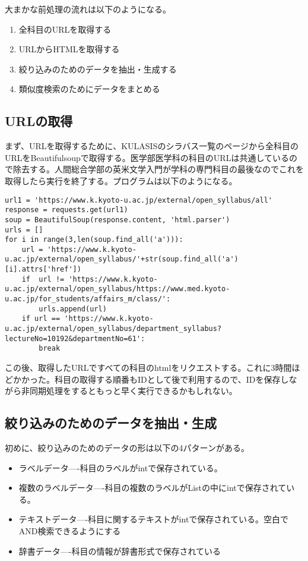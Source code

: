 大まかな前処理の流れは以下のようになる。\\
\begin{enumerate}
  \item 全科目のURLを取得する
  \item URLからHTMLを取得する
  \item 絞り込みのためのデータを抽出・生成する
  \item 類似度検索のためにデータをまとめる
\end{enumerate}

\subsection{URLの取得}
まず、URLを取得するために、KULASISのシラバス一覧のページから全科目のURLをBeautifulsoupで取得する。医学部医学科の科目のURLは共通しているので除去する。人間総合学部の英米文学入門が学科の専門科目の最後なのでこれを取得したら実行を終了する。プログラムは以下のようになる。\\

\begin{lstlisting}[caption=URLの取得,label=fuga]
url1 = 'https://www.k.kyoto-u.ac.jp/external/open_syllabus/all'
response = requests.get(url1)
soup = BeautifulSoup(response.content, 'html.parser')
urls = []
for i in range(3,len(soup.find_all('a'))):
    url = 'https://www.k.kyoto-u.ac.jp/external/open_syllabus/'+str(soup.find_all('a')[i].attrs['href'])
    if  url != 'https://www.k.kyoto-u.ac.jp/external/open_syllabus/https://www.med.kyoto-u.ac.jp/for_students/affairs_m/class/':
        urls.append(url)
    if url == 'https://www.k.kyoto-u.ac.jp/external/open_syllabus/department_syllabus?lectureNo=10192&departmentNo=61':
        break
\end{lstlisting}

この後、取得したURLですべての科目のhtmlをリクエストする。これに3時間ほどかかった。科目の取得する順番もIDとして後で利用するので、IDを保存しながら非同期処理をするともっと早く実行できるかもしれない。\\

\subsection{絞り込みのためのデータを抽出・生成}
初めに、絞り込みのためのデータの形は以下の4パターンがある。

\begin{itemize}
  \item ラベルデータ----科目のラベルがintで保存されている。
  \item 複数のラベルデータ----科目の複数のラベルがListの中にintで保存されている。
  \item テキストデータ----科目に関するテキストがintで保存されている。空白でAND検索できるようにする
  \item 辞書データ----科目の情報が辞書形式で保存されている
\end{itemize}

